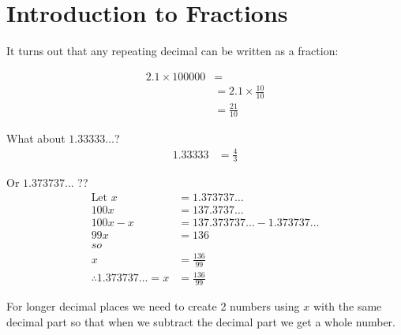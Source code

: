 \section{Introduction to Fractions}
\label{sec:IntroductionToFractions}
It turns out that any repeating decimal can be written as a fraction:

\begin{align}
  2.1 \times 100000 & = \\
    & = 2.1 \times \frac{10}{10} \\
    & = \frac{21}{10}
\end{align}

What about $1.33333\ldots$?
\begin{align}
  1.33333 & = \frac{4}{3}
\end{align}

Or $1.373737\ldots$ ??
\begin{align}
  \text{Let } x & = 1.373737\ldots\\
           100x & = 137.3737\ldots\\
       100x - x & = 137.373737\ldots - 1.373737\ldots\\
            99x & = 136 \\
  so \nonumber \\
        x & = \frac{136}{99} \\
        \therefore 1.373737\ldots = x & = \frac{136}{99}  
\end{align}

For longer decimal places we need to create 2 numbers using $x$ with the same
decimal part so that when we subtract the decimal part we get a whole number.

